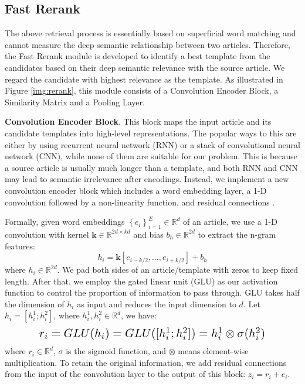 \documentclass[11pt,a4paper]{article}
\begin{document}
\begin{spacing}{1.0}
\subsection{Fast Rerank}\label{sec:rerank}
The above retrieval process is essentially based on superficial word matching and cannot measure the deep semantic relationship between two articles. Therefore, the Fast Rerank module is developed to identify a best template from the candidates based on their deep semantic relevance with the source article. We regard the candidate with highest relevance as the template. As illustrated in Figure \ref{img:rerank}, this module consists of a Convolution Encoder Block, a Similarity Matrix and a Pooling Layer.

\noindent\textbf{Convolution Encoder Block}. This block maps the input article and its candidate templates into high-level representations. The popular ways to this are either by using recurrent neural network (RNN) or a stack of convolutional neural network (CNN), while none of them are suitable for our problem. This is because a source article is usually much longer than a template, and both RNN and CNN may lead to semantic irrelevance after encodings. Instead, we implement a new convolution encoder block which includes a word embedding layer, a 1-D convolution followed by a non-linearity function, and residual connections \cite{gehring2017convolutional}.

Formally, given word embeddings $\left \{ e _{i} \right \}_{i=1}^{E}\in \mathbb{R}^d$ of an article, we use a 1-D convolution with kernel $\textbf{k}\in \mathbb{R}^{2d\times kd}$ and bias $b_h\in \mathbb{R}^{2d}$ to extract the n-gram features:
\begin{equation}
	h_i=\textbf{k}[e_{i-k/2},...,e_{i+k/2}]+b_h
\end{equation}
where $h_i\in \mathbb{R}^{2d}$. We pad both sides of an article/template with zeros to keep fixed length. After that, we employ the gated linear unit (GLU) \cite{dauphin2017language} as our activation function to control the proportion of information to pass through. GLU takes half the dimension of $h_i$ as input and reduces the input dimension to $d$. Let $h_i=[h_i^1;h_i^2]$, where $h_i^1,h_i^2\in \mathbb{R}^d$, we have:
\begin{equation}
	\resizebox{.8\hsize}{!}{$r_i=GLU(h_i)=GLU([h_i^1;h_i^2])=h_i^1\otimes \sigma(h_i^2)$}
\end{equation}
where $r_i\in \mathbb{R}^d$, $\sigma$ is the sigmoid function, and $\otimes$ means element-wise multiplication. To retain the original information, we add residual connections from the input of the convolution layer to the output of this block: $z_i=r_i+e_i$.


\end{spacing}
\end{document}
